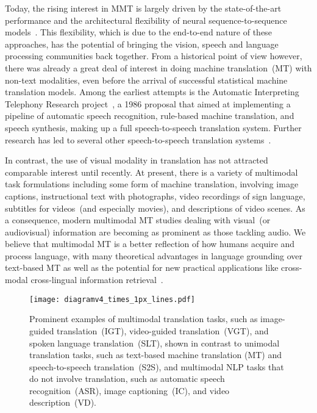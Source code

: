 \documentclass{svjour3}
\begin{document}
Today, the rising interest in MMT is largely driven by the state-of-the-art performance and the architectural flexibility of neural sequence-to-sequence models~\citep{sutskever-sequence-2014,bahdanau-neural-2015,vaswani-attention-2017}. This flexibility, which is due to the end-to-end nature of these approaches, has the potential of bringing the vision, speech and language processing communities back together.
From a historical point of view however,
    there was already a great deal of interest in doing machine translation~(MT) with non-text modalities, even before the arrival of successful statistical machine translation models. Among the earliest attempts is the Automatic Interpreting Telephony Research project~\citep{morimoto-automatic-1990}, a 1986 proposal that aimed at implementing a pipeline of automatic speech recognition, rule-based machine translation, and speech synthesis, making up a full speech-to-speech translation system. Further research has led to several other speech-to-speech translation systems~\citep{lavie-janus-iii:-1997,takezawa-japanese--english-1998,wahlster-mobile-2000}.
    
    In contrast, the use of visual modality in translation has not attracted comparable interest until recently. At present, there is a variety of multimodal task formulations including some form of machine translation,
involving image captions, instructional text with photographs, video recordings of sign language, subtitles for videos~(and especially movies), and descriptions of video scenes. As a consequence, modern multimodal MT studies dealing with visual~(or audiovisual) information are becoming as prominent as those tackling audio. We believe that multimodal MT is a better reflection of how humans acquire and process language, with many theoretical advantages in language grounding over text-based MT as well as the potential for new practical applications like cross-modal cross-lingual information retrieval~\citep{gella2017image,kadar2018lessons}.
    














    \begin{figure}[t]
        \centering
        \texttt{[image: diagramv4\_times\_1px\_lines.pdf]}
        \caption{Prominent examples of multimodal translation tasks, such as image-guided translation~(IGT), video-guided translation~(VGT), and spoken language translation~(SLT), shown in contrast to unimodal translation tasks, such as text-based machine translation (MT) and speech-to-speech translation~(S2S), and multimodal NLP tasks that do not involve translation, such as automatic speech recognition~(ASR), image captioning~(IC), and video description~(VD).}
        \label{fig:tasks}
    \end{figure}
\end{document}
